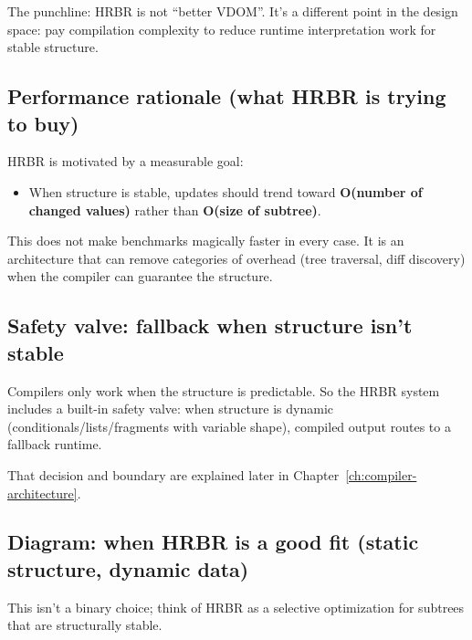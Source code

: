 The punchline: HRBR is not ``better VDOM''.
It's a different point in the design space: pay compilation complexity to reduce runtime interpretation work for stable structure.

\subsection{Performance rationale (what HRBR is trying to buy)}

HRBR is motivated by a measurable goal:

\begin{itemize}
  \item When structure is stable, updates should trend toward \textbf{O(number of changed values)} rather than \textbf{O(size of subtree)}.
\end{itemize}

This does not make benchmarks magically faster in every case.
It is an architecture that can remove categories of overhead (tree traversal, diff discovery) when the compiler can guarantee the structure.

\subsection{Safety valve: fallback when structure isn't stable}

Compilers only work when the structure is predictable.
So the HRBR system includes a built-in safety valve:
when structure is dynamic (conditionals/lists/fragments with variable shape), compiled output routes to a fallback runtime.

That decision and boundary are explained later in Chapter~\ref{ch:compiler-architecture}.

\subsection*{Diagram: when HRBR is a good fit (static structure, dynamic data)}
This isn't a binary choice; think of HRBR as a selective optimization for subtrees that are structurally stable.


